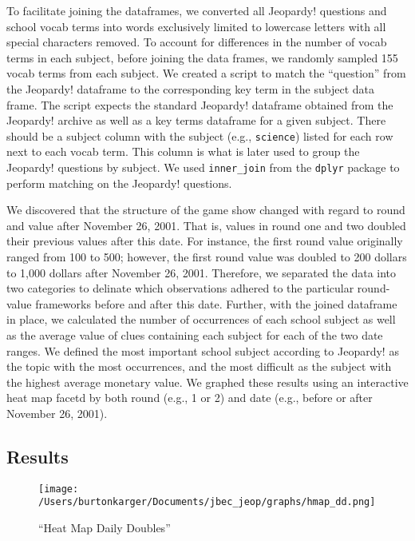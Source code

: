 \documentclass[]{article}
\begin{document}
To facilitate joining the dataframes, we converted all Jeopardy!
questions and school vocab terms into words exclusively limited to
lowercase letters with all special characters removed. To account for
differences in the number of vocab terms in each subject, before joining
the data frames, we randomly sampled 155 vocab terms from each subject.
We created a script to match the ``question'' from the Jeopardy!
dataframe to the corresponding key term in the subject data frame. The
script expects the standard Jeopardy! dataframe obtained from the
Jeopardy! archive as well as a key terms dataframe for a given subject.
There should be a subject column with the subject (e.g.,
\texttt{science}) listed for each row next to each vocab term. This
column is what is later used to group the Jeopardy! questions by
subject. We used \texttt{inner\_join} from the \texttt{dplyr} package to
perform matching on the Jeopardy! questions.

We discovered that the structure of the game show changed with regard to
round and value after November 26, 2001. That is, values in round one
and two doubled their previous values after this date. For instance, the
first round value originally ranged from 100 to 500; however, the first
round value was doubled to 200 dollars to 1,000 dollars after November
26, 2001. Therefore, we separated the data into two categories to
delinate which observations adhered to the particular round-value
frameworks before and after this date. Further, with the joined
dataframe in place, we calculated the number of occurrences of each
school subject as well as the average value of clues containing each
subject for each of the two date ranges. We defined the most important
school subject according to Jeopardy! as the topic with the most
occurrences, and the most difficult as the subject with the highest
average monetary value. We graphed these results using an interactive
heat map facetd by both round (e.g., 1 or 2) and date (e.g., before or
after November 26, 2001).

\hypertarget{results}{%
\subsection{Results}\label{results}}

\begin{figure}
\centering
\texttt{[image: /Users/burtonkarger/Documents/jbec\_jeop/graphs/hmap\_dd.png]}
\caption{``Heat Map Daily Doubles''}
\end{figure}
\end{document}
